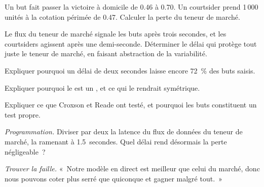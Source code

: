 \begin{exercise}[$\star$]\label{exo:hf:prediction-and-sports-market-making:2}
Un but fait passer la victoire à domicile de 0.46 à 0.70. Un courtsider prend 1\,000 unités à la cotation périmée de 0.47. Calculer la perte du teneur de marché.
\end{exercise}

\begin{exercise}[$\star$]\label{exo:hf:prediction-and-sports-market-making:3}
Le flux du teneur de marché signale les buts après trois secondes, et les courtsiders agissent après une demi-seconde. Déterminer le délai qui protège tout juste le teneur de marché, en
faisant abstraction de la variabilité.
\end{exercise}

\begin{exercise}[$\star\star$]\label{exo:hf:prediction-and-sports-market-making:4}
Expliquer pourquoi un délai de deux secondes laisse encore 72~\% des buts saisis.
\end{exercise}

\begin{exercise}[$\star\star$]\label{exo:hf:prediction-and-sports-market-making:5}
Expliquer pourquoi le  est un , et ce qui le rendrait symétrique.
\end{exercise}

\begin{exercise}[$\star\star$]\label{exo:hf:prediction-and-sports-market-making:6}
Expliquer ce que Croxson et Reade ont testé, et pourquoi les buts constituent un test propre.
\end{exercise}

\begin{exercise}[$\star\star\star$]\label{exo:hf:prediction-and-sports-market-making:7}
\emph{Programmation.} Diviser par deux la latence du flux de données du teneur de marché, la ramenant à 1.5~secondes. Quel délai rend désormais la perte négligeable~?
\end{exercise}

\begin{exercise}[$\star\star\star$]\label{exo:hf:prediction-and-sports-market-making:8}
\emph{Trouver la faille.} «~Notre modèle en direct est meilleur que celui du marché, donc nous pouvons coter plus serré que quiconque et gagner malgré tout.~»
\end{exercise}

